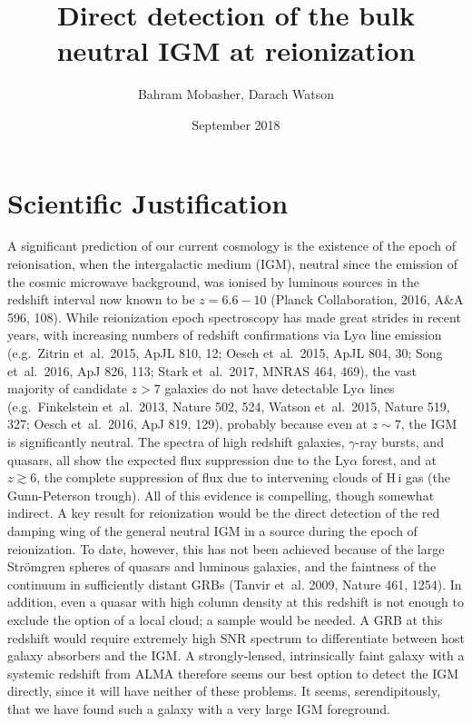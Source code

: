 \documentclass[letter,12pt]{article}
\title{Direct detection of the bulk neutral IGM at reionization}
\author{Bahram Mobasher, Darach Watson}
\date{September 2018}
\begin{document}
\maketitle

\section{Scientific Justification}
A significant prediction of our current cosmology is the existence of the
epoch of reionisation, when the intergalactic medium (IGM), neutral since
the emission of the cosmic microwave background, was ionised by luminous
sources in the redshift interval now known to be $z=6.6-10$ (Planck
Collaboration, 2016, A\&A 596, 108).  %
While reionization epoch spectroscopy has made great strides in recent
years, with increasing numbers of redshift confirmations via Ly$\alpha$ line emission
(e.g.\ Zitrin et~al.\ 2015, ApJL 810, 12; Oesch et~al.\ 2015, ApJL 804, 30; Song
et~al.\ 2016, ApJ 826, 113; Stark et~al.\ 2017, MNRAS 464, 469), the vast
majority of candidate $z>7$ galaxies do not have detectable Ly$\alpha$ lines
(e.g.\ Finkelstein et~al.\ 2013, Nature 502, 524, Watson et~al.\
2015, Nature 519, 327; Oesch et~al.\ 2016, ApJ 819, 129), probably because even at $z\sim7$, the IGM
is significantly neutral.  The spectra of high redshift galaxies, $\gamma$-ray
bursts, and quasars, all show the expected flux suppression due to
the Ly$\alpha$ forest, and at $z\gtrsim 6$, the complete
suppression of flux due to
intervening clouds of H\,{\sc i} gas (the Gunn-Peterson trough). All of this
evidence is compelling, though somewhat indirect. A key result for reionization
would be the direct detection of the red damping wing of the
general neutral IGM in a source during the epoch of reionization.
To date, however, this has not been achieved because of the large
Str\"{o}mgren spheres of quasars and luminous galaxies, and the
faintness of the continuum in sufficiently distant GRBs (Tanvir et~al. 2009, Nature 461, 1254).
In addition, even a quasar with high
column density at this redshift is not enough to exclude the option of a local cloud; a
sample would be needed. A GRB at this redshift
would require extremely high SNR spectrum to differentiate between
host galaxy absorbers and the IGM.  A strongly-lensed, intrinsically faint
galaxy with a systemic redshift from ALMA therefore seems our best option to
detect the IGM directly, since it will have neither of these problems.  It
seems, serendipitously, that we have found such a galaxy with a very large
IGM foreground.
\end{document}
